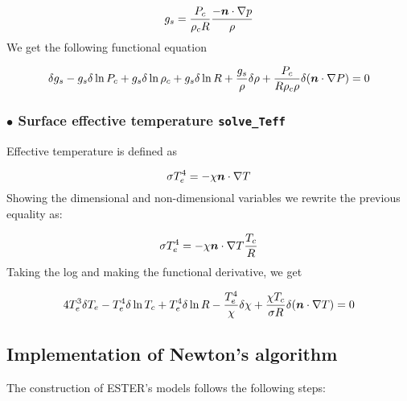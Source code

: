 \[ g_s=\frac{P_c}{\rho_cR}\frac{-\vn\cdot\nabla p}{\rho}\]
We get the following functional equation

\begin{equation}
\delta g_s -g_s\delta\ln P_c +g_s\delta\ln\rho_c+g_s\delta\ln R + \frac{g_s}{\rho}\delta\rho+
\frac{P_c}{R\rho_c\rho}\delta(\vn\cdot\nabla P) = 0
\end{equation}

\subsubsection{$\bullet$ \bf Surface effective temperature {\tt solve\_Teff}}

Effective temperature is defined as

\[ \sigma T_e^4 = -\khi\vn\cdot\na T\]
Showing the dimensional and non-dimensional variables we rewrite the previous equality as:

\[ \sigma T_e^4 = -\khi\vn\cdot\na T \frac{T_c}{R}\]
Taking the log and making the functional derivative, we get

\begin{equation}
4T_e^3\delta T_e -T_e^4\delta\ln T_c + T_e^4\delta\ln R -\frac{T_e^4}{\khi}\delta\khi + \frac{\khi T_c}{\sigma
R}\delta(\vn\cdot\nabla T) = 0
\end{equation}




\subsection{Implementation of Newton's algorithm}

The construction of ESTER's models follows the following steps:


